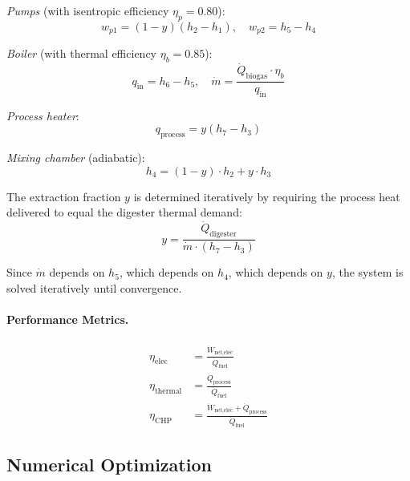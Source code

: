 \documentclass[12pt, letterpaper]{article}
\begin{document}
\textit{Pumps} (with isentropic efficiency $\eta_p = 0.80$):
\begin{equation}
  w_{p1} = (1-y)(h_2 - h_1), \quad w_{p2} = h_5 - h_4
  \label{eq:w_pumps}
\end{equation}

\textit{Boiler} (with thermal efficiency $\eta_b = 0.85$):
\begin{equation}
  q_\text{in} = h_6 - h_5, \quad \dot{m} = \frac{\dot{Q}_\text{biogas} \cdot \eta_b}{q_\text{in}}
  \label{eq:q_boiler}
\end{equation}

\textit{Process heater}:
\begin{equation}
  q_\text{process} = y(h_7 - h_3)
  \label{eq:q_process}
\end{equation}

\textit{Mixing chamber} (adiabatic):
\begin{equation}
  h_4 = (1-y) \cdot h_2 + y \cdot h_3
  \label{eq:mixing}
\end{equation}

The extraction fraction $y$ is determined iteratively by requiring the process heat delivered to equal the digester thermal demand:
\begin{equation}
  y = \frac{\dot{Q}_\text{digester}}{\dot{m} \cdot (h_7 - h_3)}
  \label{eq:y}
\end{equation}

Since $\dot{m}$ depends on $h_5$, which depends on $h_4$, which depends on $y$, the system is solved iteratively until convergence.

\paragraph{Performance Metrics.}
\begin{align}
  \eta_\text{elec} &= \frac{\dot{W}_\text{net,elec}}{\dot{Q}_\text{fuel}} \label{eq:eta_elec} \\
  \eta_\text{thermal} &= \frac{\dot{Q}_\text{process}}{\dot{Q}_\text{fuel}} \label{eq:eta_thermal} \\
  \eta_\text{CHP} &= \frac{\dot{W}_\text{net,elec} + \dot{Q}_\text{process}}{\dot{Q}_\text{fuel}} \label{eq:eta_chp}
\end{align}

\subsection{Numerical Optimization}
\end{document}
